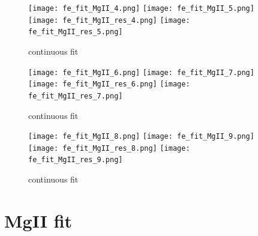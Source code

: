 \documentclass[usenatbib]{mn2e}
\begin{document}
\newpage


\begin{figure}
\begin{center}
\texttt{[image: fe\_fit\_MgII\_4.png]}
\vspace{5mm}
\texttt{[image: fe\_fit\_MgII\_5.png]}\\
\texttt{[image: fe\_fit\_MgII\_res\_4.png]}
\hspace{5mm}
\texttt{[image: fe\_fit\_MgII\_res\_5.png]}\\
\end{center} 
\caption{continuous fit \label{fig:landscape}}   
\end{figure}

\newpage


\begin{figure}
\begin{center}
\texttt{[image: fe\_fit\_MgII\_6.png]}
\vspace{5mm}
\texttt{[image: fe\_fit\_MgII\_7.png]}\\
\texttt{[image: fe\_fit\_MgII\_res\_6.png]}
\hspace{5mm}
\texttt{[image: fe\_fit\_MgII\_res\_7.png]}\\
\end{center} 
\caption{continuous fit \label{fig:landscape}}   
\end{figure}

\newpage

\begin{figure}
\begin{center}
\texttt{[image: fe\_fit\_MgII\_8.png]}
\vspace{5mm}
\texttt{[image: fe\_fit\_MgII\_9.png]}\\
\texttt{[image: fe\_fit\_MgII\_res\_8.png]}
\hspace{5mm}
\texttt{[image: fe\_fit\_MgII\_res\_9.png]}\\
\end{center} 
\caption{continuous fit \label{fig:landscape}}   
\end{figure}

\newpage


\section{MgII fit}
\end{document}
